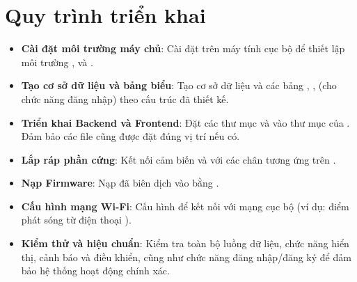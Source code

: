 \section{Quy trình triển khai}
\begin{itemize}
	\item \textbf{Cài đặt môi trường máy chủ}: Cài đặt  trên máy tính cục bộ để thiết lập môi trường ,  và .
	\item \textbf{Tạo cơ sở dữ liệu và bảng biểu}: Tạo cơ sở dữ liệu  và các bảng , ,  (cho chức năng đăng nhập) theo cấu trúc đã thiết kế.
	\item \textbf{Triển khai Backend và Frontend}: Đặt các thư mục  và  vào thư mục  của . Đảm bảo các file  cũng được đặt đúng vị trí nếu có.
	\item \textbf{Lắp ráp phần cứng}: Kết nối cảm biến  và  với các chân  tương ứng trên .
	\item \textbf{Nạp Firmware}: Nạp  đã biên dịch vào  bằng .
	\item \textbf{Cấu hình mạng Wi-Fi}: Cấu hình  để kết nối với mạng  cục bộ (ví dụ: điểm phát sóng từ điện thoại ).
	\item \textbf{Kiểm thử và hiệu chuẩn}: Kiểm tra toàn bộ luồng dữ liệu, chức năng hiển thị, cảnh báo và điều khiển, cũng như chức năng đăng nhập/đăng ký để đảm bảo hệ thống hoạt động chính xác.
\end{itemize}